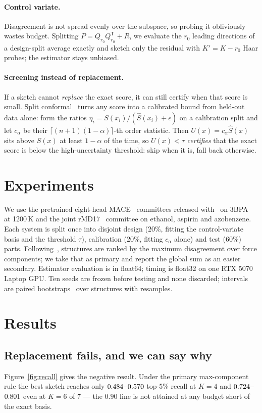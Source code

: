 \documentclass{article}
\begin{document}
\paragraph{Control variate.} Disagreement is not spread evenly over the subspace, so probing it
obliviously wastes budget. Splitting $P=Q_{r_0}Q_{r_0}^{\mathsf T}+R$, we evaluate the $r_0$ leading
directions of a design-split average exactly and sketch only the residual with $K'=K-r_0$ Haar
probes; the estimator stays unbiased.

\paragraph{Screening instead of replacement.} If a sketch cannot \emph{replace} the exact score, it
can still certify when that score is small. Split conformal~\citep{vovk2005,crc} turns any score into
a calibrated bound from held-out data alone: form the ratios
$\eta_i=S(x_i)/(\widehat S(x_i)+\epsilon)$ on a calibration split and let $c_\alpha$ be their
$\lceil (n+1)(1-\alpha)\rceil$-th order statistic. Then $U(x)=c_\alpha\widehat S(x)$ sits above
$S(x)$ at least $1-\alpha$ of the time, so $U(x)<\tau$ \emph{certifies} that the exact score is below
the high-uncertainty threshold: skip when it is, fall back otherwise.

\section{Experiments}
\label{sec:setup}
We use the pretrained eight-head MACE~\citep{mace} committees released
with~\citet{beck2025mhc} on 3BPA~\citep{botnet3bpa} at 1200\,K and the joint rMD17~\citep{rmd17}
committee on ethanol, aspirin and azobenzene. Each system is split once into disjoint design
($20\%$, fitting the control-variate basis and the threshold $\tau$), calibration ($20\%$, fitting
$c_\alpha$ alone) and test ($60\%$) parts. Following~\citet{beck2025mhc}, structures are ranked by
the maximum disagreement over force components; we take that as primary and report the global sum as
an easier secondary. Estimator evaluation is in float64; timing is float32 on one RTX 5070 Laptop
GPU. Ten seeds are frozen before testing and none discarded; intervals are paired
bootstraps~\citep{efron} over structures with \fsNBoot{} resamples.

\section{Results}
\subsection{Replacement fails, and we can say why}
Figure~\ref{fig:recall} gives the negative result. Under the primary max-component rule the best
sketch reaches only $0.484$--$0.570$ top-5\% recall at $K{=}4$ and
$0.724$--$0.801$ even at $K{=}6$ of $7$ --- the $0.90$ line is not attained
at any budget short of the exact basis.
\end{document}
